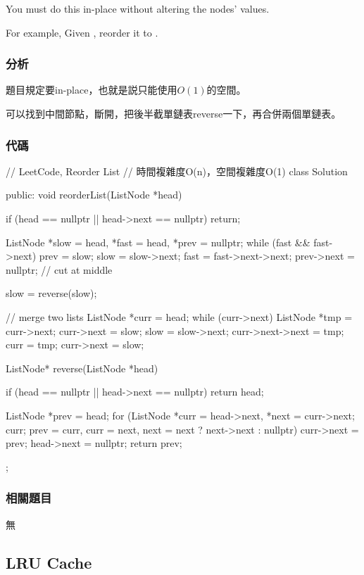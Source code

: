 You must do this in-place without altering the nodes' values.

For example,
Given , reorder it to .


\subsubsection{分析}
題目規定要in-place，也就是説只能使用$O(1)$的空間。

可以找到中間節點，斷開，把後半截單鏈表reverse一下，再合併兩個單鏈表。


\subsubsection{代碼}
\begin{Code}
// LeetCode, Reorder List
// 時間複雜度O(n)，空間複雜度O(1)
class Solution {
public:
    void reorderList(ListNode *head) {
        if (head == nullptr || head->next == nullptr) return;

        ListNode *slow = head, *fast = head, *prev = nullptr;
        while (fast && fast->next) {
            prev = slow;
            slow = slow->next;
            fast = fast->next->next;
        }
        prev->next = nullptr; // cut at middle

        slow = reverse(slow);

        // merge two lists
        ListNode *curr = head;
        while (curr->next) {
            ListNode *tmp = curr->next;
            curr->next = slow;
            slow = slow->next;
            curr->next->next = tmp;
            curr = tmp;
        }
        curr->next = slow;
    }

    ListNode* reverse(ListNode *head) {
        if (head == nullptr || head->next == nullptr) return head;

        ListNode *prev = head;
        for (ListNode *curr = head->next, *next = curr->next; curr;
            prev = curr, curr = next, next = next ? next->next : nullptr) {
                curr->next = prev;
        }
        head->next = nullptr;
        return prev;
    }
};
\end{Code}


\subsubsection{相關題目}
\begindot
\item 無
\myenddot


\subsection{LRU Cache}
\label{sec:lru-cache}


